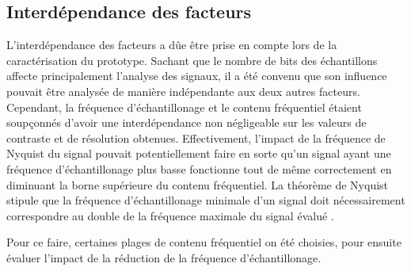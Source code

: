 \documentclass[11pt,letterpaper]{article}
\begin{document}
\subsection{Interdépendance des facteurs}
L'interdépendance des facteurs a dûe être prise en compte lors de la caractérisation du prototype. Sachant que le nombre
de bits des échantillons affecte principalement l'analyse des signaux, il a été convenu que son influence pouvait être analysée
de manière indépendante aux deux autres facteurs. Cependant, la fréquence d'échantillonage et le contenu fréquentiel étaient soupçonnés
d'avoir une interdépendance non négligeable sur les valeurs de contraste et de résolution obtenues. Effectivement, l'impact de la fréquence
de Nyquist du signal pouvait potentiellement faire en sorte qu'un signal ayant une fréquence d'échantillonage plus basse fonctionne tout de même 
correctement en diminuant la borne supérieure du contenu fréquentiel. La théorème de Nyquist stipule que la fréquence d'échantillonage
minimale d'un signal doit nécessairement correspondre au double de la fréquence maximale du signal évalué \cite{nyquist}. 

Pour ce faire, certaines plages de contenu fréquentiel on été choisies, pour ensuite évaluer l'impact de la réduction de la fréquence 
d'échantillonage.
\end{document}
